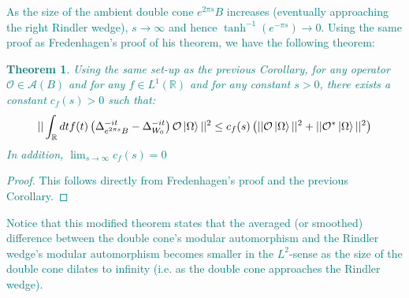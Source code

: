 \documentclass[a4paper,11pt]{article}
\newtheorem{theorem}{Theorem}
\theoremstyle{definition}
\newcommand{\lb}{\left(}
\newcommand{\rb}{\right)}
\newcommand{\YC}[1]{\textcolor{teal}{#1}}
\begin{document}
\YC{
As the size of the ambient double cone $e^{2\pi s}B$ increases (eventually approaching the right Rindler wedge), $s\rightarrow\infty$ and hence $\tanh^{-1}(e^{-\pi s})\rightarrow 0$. Using the same proof as Fredenhagen's proof of his theorem, we have the following theorem:
\begin{theorem}\label{theorem:modifiedfredenhagen}
    Using the same set-up as the previous Corollary, for any operator $\mathcal{O}\in \mathcal{A}(B)$ and for any $f\in L^1(\mathbb{R})$ and for any constant $s > 0$, there exists a constant $c_f(s) > 0$ such that:
    \begin{equation}
        ||\int_\mathbb{R} dt f(t)\lb\Delta^{-it}_{e^{2\pi s}B} - \Delta^{-it}_{W_0}\rb\mathcal{O}\ket{\Omega}||^2 \leq c_f(s)\lb||\mathcal{O}\ket{\Omega}||^2 + ||\mathcal{O}^*\ket{\Omega}||^2\rb
    \end{equation}
    In addition, $\lim_{s\rightarrow \infty}c_f(s) = 0$
\end{theorem}
\begin{proof}
    This follows directly from Fredenhagen's proof and the previous Corollary.
\end{proof}
}
\YC{
Notice that this modified theorem states that the averaged (or smoothed) difference between the double cone's modular automorphism and the Rindler wedge's modular automorphism becomes smaller in the $L^2$-sense as the size of the double cone dilates to infinity (i.e. as the double cone approaches the Rindler wedge).
}
\end{document}
